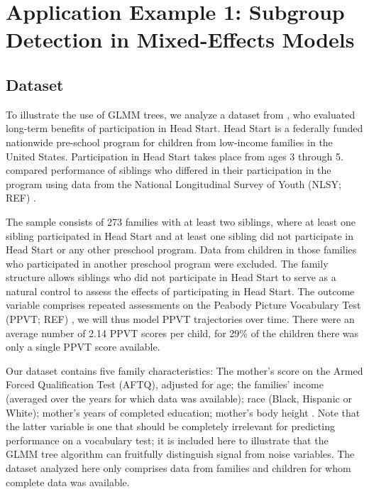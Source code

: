 \documentclass[doc,floatsintext,natbib]{apa7}
\begin{document}


\newpage
\section{Application Example 1: Subgroup Detection in Mixed-Effects Models}
\label{sec:TutorialMixed}



\subsection{Dataset}

To illustrate the use of GLMM trees, we analyze a dataset from \cite{Demi09}, who evaluated long-term benefits of participation in Head Start. Head Start is a federally funded nationwide pre-school program for children from low-income families in the United States. Participation in Head Start takes place from ages 3 through 5. \cite{Demi09} compared performance of siblings who differed in their participation in the program using data from the National Longitudinal Survey of Youth (NLSY; REF) . 

The sample consists of 273 families with at least two siblings, where at least one sibling participated in Head Start and at least one sibling did not participate in Head Start or any other preschool program. Data from children in those families who participated in another preschool program were excluded. The family structure allows siblings who did not participate in Head Start to serve as a natural control to assess the effects of participating in Head Start. The outcome variable comprises repeated assessments on the Peabody Picture Vocabulary Test (PPVT; REF) , we will thus model PPVT trajectories over time. There were an average number of 2.14 PPVT scores per child, for 29\% of the children there was only a single PPVT score available. 


Our dataset contains five family characteristics: The mother's score on the Armed Forced Qualification Test (AFTQ), adjusted for age; the families' income (averaged over the years for which data was available); race (Black, Hispanic or White); mother's years of completed education; mother's body height . Note that the latter variable is one that should be completely irrelevant for predicting performance on a vocabulary test; it is included here to illustrate that the GLMM tree algorithm can fruitfully distinguish signal from noise variables. The dataset analyzed here only comprises data from families and children for whom complete data was available. 
\end{document}
